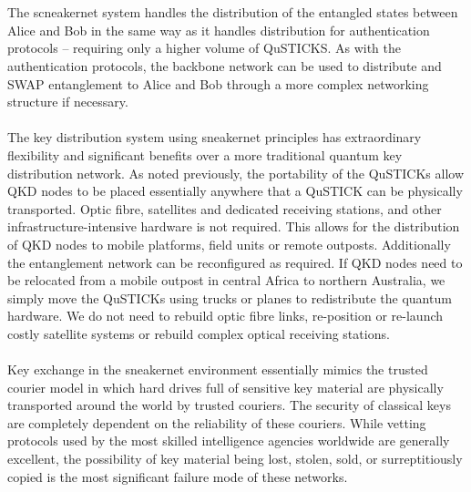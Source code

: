 \documentclass[aps,prl,twocolumn,10pt,nofootinbib]{revtex4}
\begin{document}
\\
\\
The scneakernet system handles the distribution of the entangled states between Alice and Bob in the same way as it handles distribution for authentication protocols -- requiring only a higher volume of QuSTICKS.  As with the authentication protocols, the backbone network can be used to distribute and SWAP entanglement to Alice and Bob through a more complex networking structure if necessary.  
\\
\\
The key distribution system using sneakernet principles has extraordinary flexibility and significant benefits over a more traditional quantum key distribution network.  As noted previously, the portability of the QuSTICKs allow QKD nodes to be placed essentially anywhere that a QuSTICK can be physically transported.  Optic fibre, satellites and dedicated receiving stations, and other infrastructure-intensive hardware is not required.  This allows for the distribution of QKD nodes to mobile platforms, field units or remote outposts.  Additionally the entanglement network can be reconfigured as required.  If QKD nodes need to be relocated from a mobile outpost in central Africa to northern Australia, we simply move the QuSTICKs using trucks or planes to redistribute the quantum hardware.  We do not need to rebuild optic fibre links, re-position or re-launch costly satellite systems or rebuild complex optical receiving stations.  
\\
\\
Key exchange in the sneakernet environment essentially mimics the trusted courier model in which hard drives full of sensitive key material are physically transported around the world by trusted couriers.  The security of classical keys are completely dependent on the reliability of these couriers.  While vetting protocols used by the most skilled intelligence agencies worldwide are generally excellent, the possibility of key material being lost, stolen, sold, or surreptitiously copied is the most significant failure mode of these networks.  
\\
\\
\end{document}
